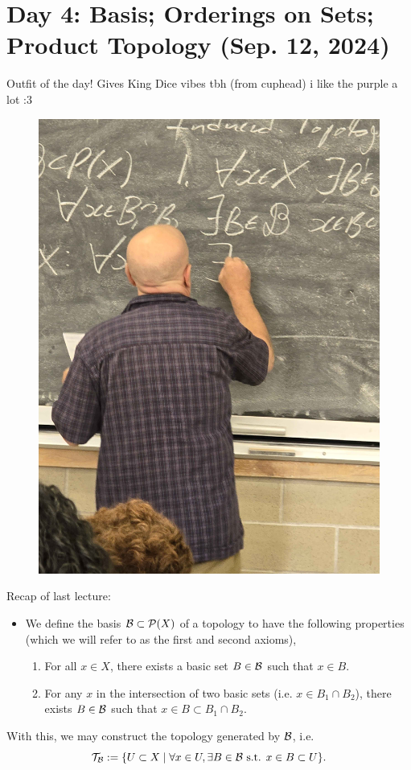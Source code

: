 \section{Day 4: Basis; Orderings on Sets; Product Topology (Sep. 12, 2024)}
Outfit of the day! Gives King Dice vibes tbh (from cuphead) i like the purple a lot :3
\begin{figure}[h]
    \centering
    \includegraphics[scale=0.1]{MAT327 Notes/Dror Shirts/dror day 4 shirt.jpg}
\end{figure}

\noindent Recap of last lecture:
\begin{itemize}
    \item We define the basis $\mathcal B \subset \mathcal P(X)$ of a topology to have the following properties (which we will refer to as the first and second axioms),
    \begin{enumerate}
        \item For all $x \in X$, there exists a basic set $B \in \mathcal B$ such that $x \in B$.
        \item For any $x$ in the intersection of two basic sets (i.e. $x \in B_1 \cap B_2$), there exists $B \in \mathcal B$ such that $x \in B \subset B_1 \cap B_2$.
    \end{enumerate}
\end{itemize}
\noindent With this, we may construct the topology generated by $\mathcal B$, i.e.
\[ \mathcal T_\mathcal B := \{ U \subset X \mid \forall x \in U, \exists B \in \mathcal B \text{ s.t. } x \in B \subset U \}. \]

